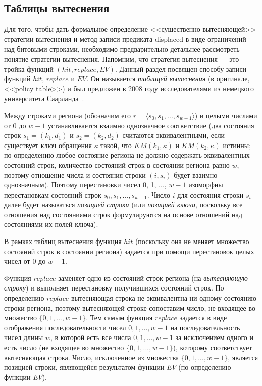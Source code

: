 \subsection{Таблицы вытеснения}\label{sec:policy_table}

Для того, чтобы дать формальное определение <<существенно вытесняющей>> стратегии вытеснения и метод записи предиката displaced в виде ограничений над битовыми строками, необходимо предварительно детальнее рассмотреть понятие стратегии вытеснения. Напомним, что стратегия вытеснения --- это тройка функций $(hit, replace, EV)$. Данный раздел посвящен способу записи функций $hit$, $replace$ и $EV$. Он называется \emph{таблицей вытеснения} (в оригинале, <<policy table>>) и был предложен в 2008 году исследователями из немецкого университета Саарланда~\cite{policy_tables}.

Между строками региона (обозначим его $r = \langle s_0, s_1, ..., s_{w-1} \rangle$) и целыми числами от 0 до $w{-}1$ устанавливается взаимно однозначное соответствие (два состояния строк $s_1 = (k_1, d_1)$ и $s_2 = (k_2, d_2)$ считаются эквивалентными, если существует ключ обращения $\kappa$ такой, что $KM(k_1, \kappa)$ и $KM(k_2, \kappa)$ истинны;  по определению любое состояние региона не должно содержать эквивалентных состояний строк, количество состояний строк в состоянии региона равно $w$, поэтому отношение числа и состояния строки $(i, s_i)$ будет взаимно однозначным). Поэтому перестановки чисел 0, 1, ..., $w{-}1$ изоморфны перестановкам состояний строк $s_0, s_1, ..., s_{w-1}$. Число $i$ для состояния строки $s_i$ далее будет называться \emph{позицией строки} (или \emph{позицией ключа}, поскольку все отношения над состояниями строк формулируются на основе отношений над состояниями их полей ключа).

В рамках таблиц вытеснения функция $hit$ (поскольку она не меняет множество состояний строк в состоянии региона) задается при помощи перестановок целых чисел от 0 до $w{-}1$.

Функция $replace$ заменяет одно из состояний строк региона (на \emph{вытесняющую строку}) и выполняет перестановку получившихся состояний строк. По определению $replace$ вытесняющая строка не эквивалентна ни одному состоянию строки региона, поэтому вытесняющей строке сопоставим число, не входящее во множество $\{0, 1, ..., w{-}1\}$. Тем самым функция $replace$ задается в виде отображения последовательности чисел $0, 1, ..., w{-}1$ на последовательность чисел длины $w$, в которой есть все числа $0, 1, ..., w{-}1$ за исключением одного и есть число (не входящее во множество $\{0, 1, ..., w{-}1\}$), которому соответствует вытесняющая строка. Число, исключенное из множества $\{0, 1, ..., w{-}1\}$, является позицией строки, являющейся результатом функции $EV$ (по определению функции $EV$).

